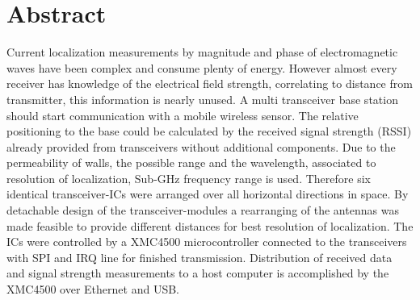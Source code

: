 \newpage
\chapter*{Abstract}
\label{sec:abstract}
\pagestyle{scrheadings}

Current localization measurements by magnitude and phase of electromagnetic waves have been complex and consume plenty of energy. However almost every receiver has knowledge of the electrical field strength, correlating to distance from transmitter, this information is nearly unused. A multi transceiver base station should start communication with a mobile wireless sensor. The relative positioning to the base could be calculated by the received signal strength (RSSI) already provided from transceivers without additional components. Due to the permeability of walls, the possible range and the wavelength, associated to resolution of localization,   Sub-GHz frequency range is used.  Therefore six identical transceiver-ICs were arranged over all horizontal directions in space. By detachable design of the transceiver-modules a rearranging of the antennas was made feasible to provide different distances for best resolution of localization. The ICs were controlled by a XMC4500 microcontroller connected to the transceivers with SPI and IRQ line for finished transmission. Distribution of received data and signal strength measurements to a host computer is accomplished by the XMC4500 over Ethernet and USB.